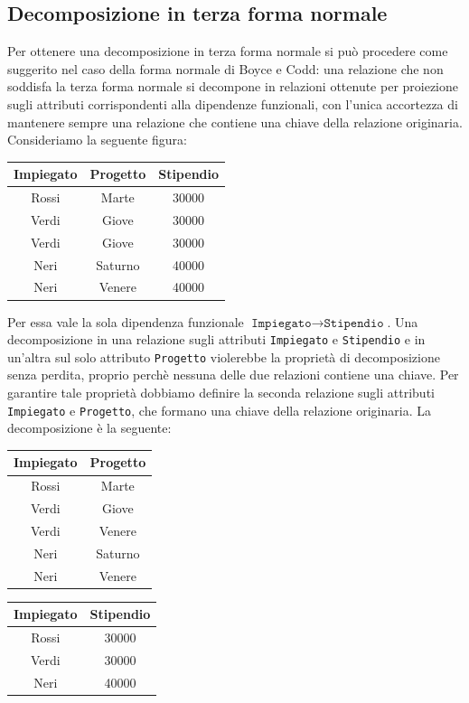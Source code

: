 \documentclass[12pt]{report}
\begin{document}
	\subsection{Decomposizione in terza forma normale}
	Per ottenere una decomposizione in terza forma normale si può procedere come suggerito nel caso della forma normale di Boyce e Codd: una relazione che non soddisfa la terza forma normale si decompone in relazioni ottenute per proiezione sugli attributi corrispondenti alla dipendenze funzionali, con l'unica accortezza di mantenere sempre una relazione che contiene una chiave della relazione originaria. \\
	Consideriamo la seguente figura:
	\begin{center}
	\begin{tabular}{|c|c|c|}
		\hline
		Impiegato & Progetto & Stipendio \\
		\hline
		Rossi & Marte & 30000 \\
		Verdi & Giove & 30000 \\
		Verdi & Giove & 30000 \\
		Neri & Saturno & 40000 \\
		Neri & Venere & 40000 \\
		\hline
	\end{tabular}
	\end{center}
	Per essa vale la sola dipendenza funzionale $\texttt{Impiegato} \to \texttt{Stipendio}$. Una decomposizione in una relazione sugli attributi \texttt{Impiegato} e \texttt{Stipendio} e in un'altra sul solo attributo \texttt{Progetto} violerebbe la proprietà di decomposizione senza perdita, proprio perchè nessuna delle due relazioni contiene una chiave. Per garantire tale proprietà dobbiamo definire la seconda relazione sugli attributi \texttt{Impiegato} e \texttt{Progetto}, che formano una chiave della relazione originaria. La decomposizione è la seguente:
	\begin{center}
	\begin{tabular}{|c|c|}
		\hline
		Impiegato & Progetto \\
		\hline
		Rossi & Marte \\
		Verdi & Giove \\
		Verdi & Venere \\
		Neri & Saturno \\
		Neri & Venere \\
		\hline
	\end{tabular}
	\hspace{1cm}
	\begin{tabular}{|c|c|}
		\hline
		Impiegato & Stipendio \\
		\hline
		Rossi & 30000 \\
		Verdi & 30000 \\
		Neri & 40000 \\
		\hline
	\end{tabular}
	\end{center}
\end{document}
